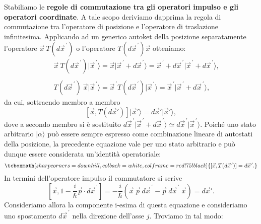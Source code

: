 Stabiliamo le \textbf{regole di commutazione tra gli operatori impulso e gli operatori coordinate}. A tale scopo deriviamo dapprima la regola di commutazione tra l'operatore di posizione e l'operatore di traslazione infinitesima. Applicando ad un generico autoket della posizione separatamente l'operatore $\vec{x}\ T(d{\vec{x}}^{\, \prime})$ o l'operatore $T(d{\vec{x}}^{\, \prime})\vec{x}$ otteniamo:
	\begin{eqnarray}
		& & \vec{x}\ T(d{\vec{x}}^{\, \prime})\vert {\vec{x}}^{\, \prime} \rangle = \vec{x}\vert{\vec{x}}^{\, \prime}+d{\vec{x}}^{\, \prime}\rangle ={\vec{x}}^{\, \prime}+d{\vec{x}}^{\, \prime}\vert{\vec{x}}^{\, \prime}+d{\vec{x}}^{\, \prime}\rangle ,  \\
 \nonumber \\
		& & T(d{\vec{x}}^{\, \prime})\ \vec{x} \vert {\vec{x}}^{\, \prime} \rangle = {\vec{x}}^{\, \prime} T(d{\vec{x}}^{\, \prime})\vert {\vec{x}}^{\, \prime}\rangle = {\vec{x}}^{\, \prime}\vert {\vec{x}}^{\, \prime}+d{\vec{x}}^{\, \prime}\rangle ,
	\end{eqnarray}
da cui, sottraendo membro a membro
	\begin{equation}
		\left[\vec{x}, T(d\vec{x}')\right]\vert \vec{x}' \rangle = d\vec{x}' \vert \vec{x}' \rangle ,
	\end{equation}
dove a secondo membro si è sostituito $d{\vec{x}}^{\, \prime} \vert {\vec{x}}^{\, \prime}+d{\vec{x}}^{\, \prime}\rangle \simeq d{\vec{x}}^{\, \prime} \vert {\vec{x}}^{\, \prime}\rangle$. Poiché uno stato arbitrario $\vert \alpha \rangle $ può essere sempre espresso come combinazione lineare di autostati della posizione, la precedente equazione vale per uno stato arbitrario e può dunque essere considerata un'identità operatoriale:
	\begin{equation}
		\tcboxmath[sharp corners=downhill ,colback=white,colframe=red!75!black]{	
			\left[\vec{x}, T(d{\vec{x}}^{\, \prime})\right] = d{\vec{x}}^{\, \prime} .
			}
	\end{equation}
In termini dell'operatore impulso il commutatore si scrive
	\begin{equation}
		\left[ \vec{x}, 1- \frac{i}{\hbar}\vec{p}\cdot d{\vec{x}}^{\, \prime}\right] =-\frac{i}{\hbar}\left(\vec{x}\ \vec{p}\ d{\vec{x}}^{\, \prime}-\vec{p}\ d{\vec{x}}^{\, \prime}\ \vec{x} \right) =d\vec{x}' .
	\end{equation}
Consideriamo allora la componente i-esima di questa equazione e consideriamo uno spostamento $d{\vec{x}}^{\, \prime}$ nella direzione dell'asse $j$. Troviamo in tal modo:
